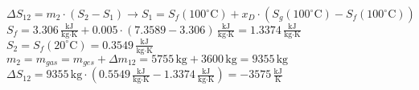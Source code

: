 \( \Delta S_{12} = m_2 \cdot (S_2 - S_1) \rightarrow S_1 = S_f(100^\circ \text{C}) + x_D \cdot (S_g(100^\circ \text{C}) - S_f(100^\circ \text{C})) \)  
\( S_f = 3.306 \, \frac{\text{kJ}}{\text{kg·K}} + 0.005 \cdot (7.3589 - 3.306) \, \frac{\text{kJ}}{\text{kg·K}} = 1.3374 \, \frac{\text{kJ}}{\text{kg·K}} \)  
\( S_2 = S_f(20^\circ \text{C}) = 0.3549 \, \frac{\text{kJ}}{\text{kg·K}} \)  
\( m_2 = m_{gas} = m_{ges} + \Delta m_{12} = 5755 \, \text{kg} + 3600 \, \text{kg} = 9355 \, \text{kg} \)  
\( \Delta S_{12} = 9355 \, \text{kg} \cdot (0.5549 \, \frac{\text{kJ}}{\text{kg·K}} - 1.3374 \, \frac{\text{kJ}}{\text{kg·K}}) = -3575 \, \frac{\text{kJ}}{\text{K}} \)